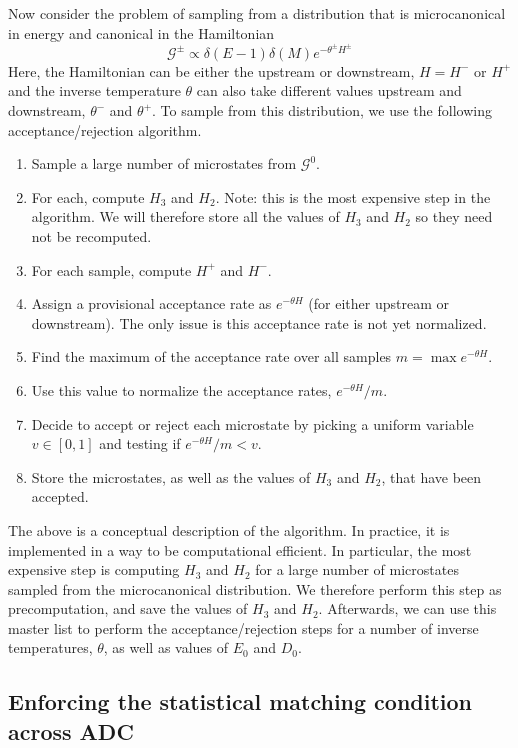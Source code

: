 \documentclass[12pt]{article}
\newcommand{\Gibbs}{\mathcal{G}}
\begin{document}
Now consider the problem of sampling from a distribution that is microcanonical in energy and canonical in the Hamiltonian
\begin{equation}
\Gibbs^{\pm} \propto \delta(E-1) \delta(M) e^{-\theta^{\pm} H^{\pm}}
\end{equation}
Here, the Hamiltonian can be either the upstream or downstream, $H = H^-$ or $H^+$ and the inverse temperature $\theta$ can also take different values upstream and downstream, $\theta^-$ and $\theta^+$. To sample from this distribution, we use the following acceptance/rejection algorithm.
\begin{enumerate}
\item Sample a large number of microstates from $\Gibbs^0$.
\item For each, compute $H_3$ and $H_2$. Note: this is the most expensive step in the algorithm. We will therefore store all the values of $H_3$ and $H_2$ so they need not be recomputed.
\item For each sample, compute $H^+$ and $H^-$.
\item Assign a provisional acceptance rate as $e^{- \theta H}$ (for either upstream or downstream). The only issue is this acceptance rate is not yet normalized.
\item Find the maximum of the acceptance rate over all samples $m = \max{e^{-\theta H}}$.
\item Use this value to normalize the acceptance rates, $e^{- \theta H}/m$.
\item Decide to accept or reject each microstate by picking a uniform variable $v \in [0,1]$ and testing if $e^{- \theta H}/m < v$.
\item Store the microstates, as well as the values of $H_3$ and $H_2$, that have been accepted.
\end{enumerate}
The above is a conceptual description of the algorithm. In practice, it is implemented in a way to be computational efficient. In particular, the most expensive step is computing $H_3$ and $H_2$ for a large number of microstates sampled from the microcanonical distribution. We therefore perform this step as precomputation, and save the values of $H_3$ and $H_2$. Afterwards, we can use this master list to perform the acceptance/rejection steps for a number of inverse temperatures, $\theta$, as well as values of $E_0$ and $D_0$.

\subsection{Enforcing the statistical matching condition across ADC}
\label{sec_match}
\end{document}
